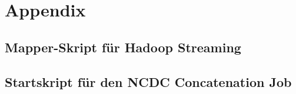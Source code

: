 \chapter{Appendix}

\section{Mapper-Skript für Hadoop Streaming}\label{appendix lst:ncdc concatenate script}


\section{Startskript für den NCDC Concatenation Job}\label{appendix lst:ncdc concatenate start script}
